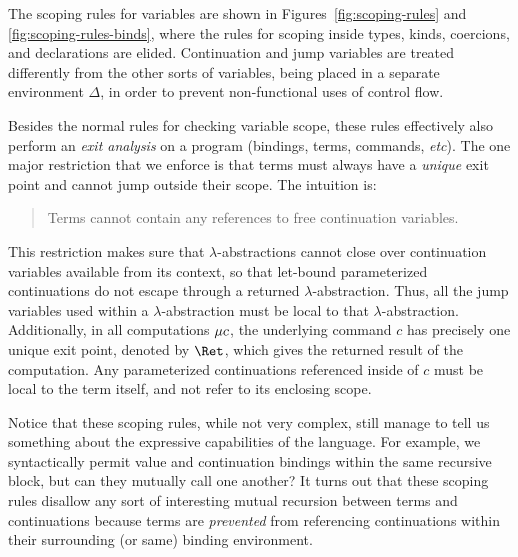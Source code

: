 \documentclass{article}
\begin{document}
The scoping rules for variables are shown in Figures~\ref{fig:scoping-rules} and
\ref{fig:scoping-rules-binds}, where the rules for scoping inside types, kinds,
coercions, and declarations are elided.  Continuation and jump variables are
treated differently from the other sorts of variables, being placed in a
separate environment $\Delta$, in order to prevent non-functional uses of
control flow.

Besides the normal rules for checking variable scope, these rules effectively
also perform an \emph{exit analysis} on a program (bindings, terms, commands,
\emph{etc}).  The one major restriction that we enforce is that terms must
always have a \emph{unique} exit point and cannot jump outside their scope.  The
intuition is:
\begin{quote}
  Terms cannot contain any references to free continuation variables.
\end{quote}
This restriction makes sure that $\lambda$-abstractions cannot close over
continuation variables available from its context, so that let-bound
parameterized continuations do not escape through a returned
$\lambda$-abstraction.  Thus, all the jump variables used within a
$\lambda$-abstraction must be local to that $\lambda$-abstraction.
Additionally, in all computations $\comp{r}\cmd$, the underlying command $c$ has
precisely one unique exit point, denoted by $\ret r$, which gives the returned
result of the computation.  Any parameterized continuations referenced inside of
$c$ must be local to the term itself, and not refer to its enclosing scope.


Notice that these scoping rules, while not very complex, still manage to tell us
something about the expressive capabilities of the language.  For example, we
syntactically permit value and continuation bindings within the same recursive
block, but can they mutually call one another?  It turns out that these scoping
rules disallow any sort of interesting mutual recursion between terms and
continuations because terms are \emph{prevented} from referencing continuations
within their surrounding (or same) binding environment.
\end{document}
